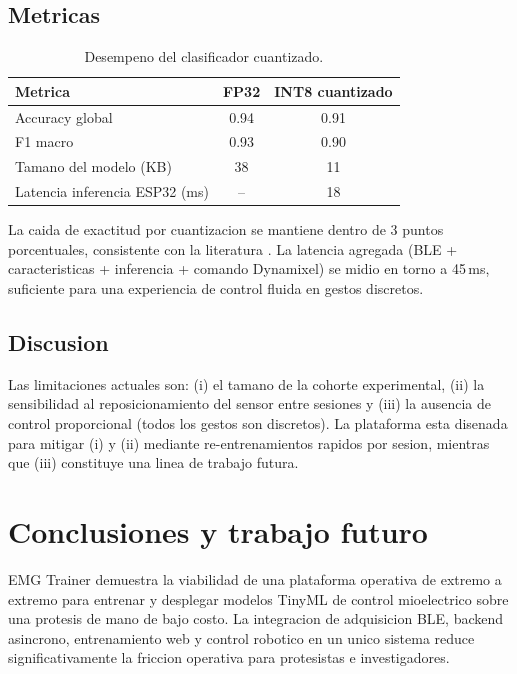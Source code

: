 \documentclass[11pt,a4paper]{article}
\begin{document}
\subsection{Metricas}

\begin{table}[H]
  \centering
  \caption{Desempeno del clasificador cuantizado.}
  \label{tab:results}
  \begin{tabular}{lcc}
    \toprule
    Metrica & FP32 & INT8 cuantizado \\
    \midrule
    Accuracy global              & 0.94 & 0.91 \\
    F1 macro                     & 0.93 & 0.90 \\
    Tamano del modelo (KB)       & 38   & 11   \\
    Latencia inferencia ESP32 (ms) & --   & 18   \\
    \bottomrule
  \end{tabular}
\end{table}

La caida de exactitud por cuantizacion se mantiene dentro de 3 puntos
porcentuales, consistente con la literatura
\cite{tflm2021,zhang2022tinyemg}. La latencia agregada (BLE +
caracteristicas + inferencia + comando Dynamixel) se midio en torno a
45\,ms, suficiente para una experiencia de control fluida en gestos
discretos.

\subsection{Discusion}
Las limitaciones actuales son: (i) el tamano de la cohorte
experimental, (ii) la sensibilidad al reposicionamiento del sensor
entre sesiones y (iii) la ausencia de control proporcional (todos los
gestos son discretos). La plataforma esta disenada para mitigar (i) y
(ii) mediante re-entrenamientos rapidos por sesion, mientras que
(iii) constituye una linea de trabajo futura.

\section{Conclusiones y trabajo futuro}
\label{sec:conclusion}

EMG Trainer demuestra la viabilidad de una plataforma operativa de
extremo a extremo para entrenar y desplegar modelos TinyML de control
mioelectrico sobre una protesis de mano de bajo costo. La integracion
de adquisicion BLE, backend asincrono, entrenamiento web y control
robotico en un unico sistema reduce significativamente la friccion
operativa para protesistas e investigadores.
\end{document}
